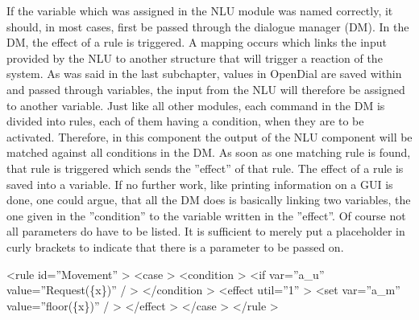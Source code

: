 \documentclass[a4paper, 12pt]{article}
\begin{document}
   If the variable which was assigned in the NLU module was named correctly, it should, in most cases, first be passed through the dialogue manager (DM).
   In the DM, the effect of a rule is triggered. A mapping occurs which links the input provided by the NLU to another structure that will trigger a reaction of the system.
   As was said in the last subchapter, values in OpenDial are saved within and passed through variables, the input from the NLU will therefore be assigned to another variable. \newline
   Just like all other modules, each command in the DM is divided into rules, each of them having a condition, when they are to be activated. 
   Therefore, in this component the output of the NLU component will be matched against all conditions in the DM. 
   As soon as one matching rule is found, that rule is triggered which sends the ”effect” of that rule.
   The effect of a rule is saved into a variable.
   If no further work, like printing information on a GUI is done, one could argue, that all the DM does is basically linking two variables, the one given in the ”condition” to the variable written in the ”effect”.
   Of course not all parameters do have to be listed.
   It is sufficient to merely put a placeholder in curly brackets to indicate that there is a parameter to be passed on. \newline


   \textless rule id=”Movement” \textgreater \newline
    \indent \indent \textless case \textgreater \newline
    \indent \indent \indent \textless condition \textgreater \newline
    \indent \indent \indent \indent \textless if var=”a\_u” value=”Request(\{x\})” / \textgreater \newline
     \indent \indent \indent \textless /condition \textgreater \newline
      \indent \indent \indent \textless effect util=”1” \textgreater \newline 
       \indent \indent \indent \indent \textless set var=”a\_m” value=”floor(\{x\})” / \textgreater \newline
        \indent \indent \indent \textless /effect \textgreater \newline
        \indent \indent \textless /case \textgreater \newline
        \indent \textless /rule \textgreater \newline
\end{document}
